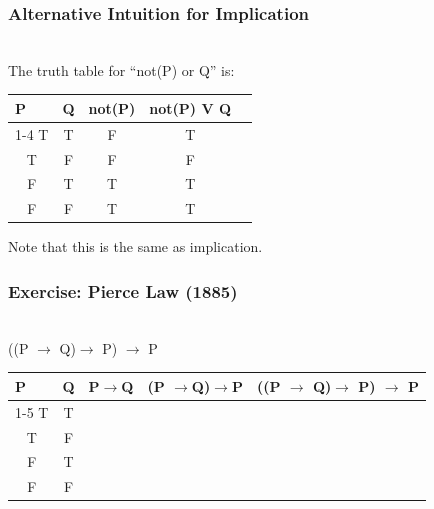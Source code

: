 \documentclass[aspectratio=169]{beamer}
\numberwithin{equation}{section}
\begin{document}
\begin{frame}
\frametitle{Alternative Intuition for Implication}

\ \\The truth table for ``not(P) or Q'' is:

\begin{table}[]
\begin{tabular}{ccccl}
\multicolumn{1}{l}{P} & \multicolumn{1}{l}{Q} & \multicolumn{1}{l}{not(P)} & \multicolumn{1}{l}{not(P) V Q}   &  \\ \cline{1-4}
T                     & T                     & F                              &   T          &  \\
T                     & F                     & F                               & F &  \\
F                     & T                     & T                               & T &  \\
F                     & F                     & T                               & T & 
\end{tabular}
\end{table} \pause
Note that this is the same as implication.
\end{frame}


\begin{frame}
\frametitle{Exercise: Pierce Law (1885)}

\ \\ ((P $\rightarrow $ Q)$\rightarrow$ P) $\rightarrow $ P

\begin{table}[]
\begin{tabular}{ccccc}
\multicolumn{1}{l}{P} & \multicolumn{1}{l}{Q} & P$\rightarrow$Q & (P $\rightarrow $Q)$\rightarrow $P & ((P $\rightarrow $ Q)$\rightarrow$ P) $\rightarrow $ P\\ \cline{1-5}
T                     & T                   \\
T                     & F                  \\
F                     & T               \\
F                     & F                
\end{tabular}
\end{table}

\end{frame}
\end{document}

